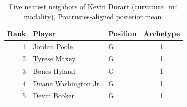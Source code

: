 \begin{table}[htbp]
  \centering\small
  \begin{tabular}{rllc}
    \toprule
    Rank & Player & Position & Archetype \\
    \midrule
    1 & Jordan Poole & G & 1 \\
    2 & Tyrese Maxey & G & 1 \\
    3 & Bones Hyland & G & 1 \\
    4 & Duane Washington Jr. & G & 1 \\
    5 & Devin Booker & G & 1 \\
    \bottomrule
  \end{tabular}
  \caption{Five nearest neighbors of Kevin Durant (curvature_m4 modality), Procrustes-aligned posterior mean.}
  \label{tab:Kevin_Durant_neighbors_curvature_m4}
\end{table}

